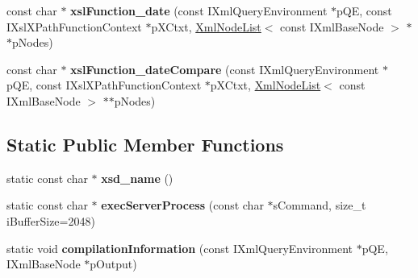 \begin{DoxyCompactItemize}
\item 
\hypertarget{group__XSLModule-Functions_gaf84448baf79bc2f6ed8063898e47cd8d}{const char $\ast$ {\bfseries xsl\-Function\-\_\-date} (const \-I\-Xml\-Query\-Environment $\ast$p\-Q\-E, const \-I\-Xsl\-X\-Path\-Function\-Context $\ast$p\-X\-Ctxt, \hyperlink{classgeneral__server_1_1XmlNodeList}{\-Xml\-Node\-List}$<$ const \-I\-Xml\-Base\-Node $>$ $\ast$$\ast$p\-Nodes)}\label{group__XSLModule-Functions_gaf84448baf79bc2f6ed8063898e47cd8d}

\item 
\hypertarget{group__XSLModule-Functions_ga329682b58edd2d65a715b5dec06812be}{const char $\ast$ {\bfseries xsl\-Function\-\_\-date\-Compare} (const \-I\-Xml\-Query\-Environment $\ast$p\-Q\-E, const \-I\-Xsl\-X\-Path\-Function\-Context $\ast$p\-X\-Ctxt, \hyperlink{classgeneral__server_1_1XmlNodeList}{\-Xml\-Node\-List}$<$ const \-I\-Xml\-Base\-Node $>$ $\ast$$\ast$p\-Nodes)}\label{group__XSLModule-Functions_ga329682b58edd2d65a715b5dec06812be}

\end{DoxyCompactItemize}
\subsection*{\-Static \-Public \-Member \-Functions}
\begin{DoxyCompactItemize}
\item 
\hypertarget{classgeneral__server_1_1Server_a152ce40adf1a030d323328b033e15335}{static const char $\ast$ {\bfseries xsd\-\_\-name} ()}\label{classgeneral__server_1_1Server_a152ce40adf1a030d323328b033e15335}

\item 
\hypertarget{classgeneral__server_1_1Server_a6a702314000be130fc4d4a5665032ba6}{static const char $\ast$ {\bfseries exec\-Server\-Process} (const char $\ast$s\-Command, size\-\_\-t i\-Buffer\-Size=2048)}\label{classgeneral__server_1_1Server_a6a702314000be130fc4d4a5665032ba6}

\item 
\hypertarget{classgeneral__server_1_1Server_a3414741870ebf1893c688b769a27c01c}{static void {\bfseries compilation\-Information} (const \-I\-Xml\-Query\-Environment $\ast$p\-Q\-E, \-I\-Xml\-Base\-Node $\ast$p\-Output)}\label{classgeneral__server_1_1Server_a3414741870ebf1893c688b769a27c01c}

\end{DoxyCompactItemize}
